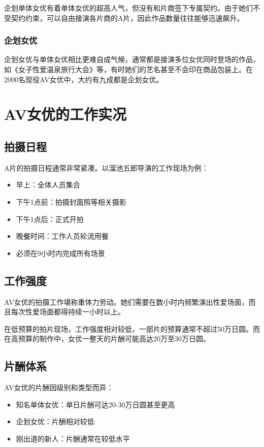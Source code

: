 \documentclass[12pt,UTF8]{ctexbook}
\begin{document}
企划单体女优有着单体女优的超高人气，但没有和片商签下专属契约。由于她们不受契约约束，可以自由接演各片商的A片，因此作品数量往往能够迅速飙升。

\subsection{企划女优}

企划女优与单体女优相比更难自成气候，通常都是接演多位女优同时登场的作品，如《女子性爱温泉旅行大会》等，有时她们的艺名甚至不会印在商品包装上。在2000名现役AV女优中，大约有九成都是企划女优。

\chapter{AV女优的工作实况}

\section{拍摄日程}

A片的拍摄日程通常非常紧凑。以溜池五郎导演的工作现场为例：
\begin{itemize}
\item 早上：全体人员集合
\item 下午1点前：拍摄封面照等相关摄影
\item 下午1点后：正式开拍
\item 晚餐时间：工作人员轮流用餐
\item 必须在9小时内完成所有场景
\end{itemize}

\section{工作强度}

AV女优的拍摄工作堪称重体力劳动。她们需要在数小时内频繁演出性爱场面，而且每次性爱场面都得持续一小时以上。

在低预算的拍片现场，工作强度相对较低，一部片的预算通常不超过50万日圆。而在高预算的制作中，女优一整天的片酬可能高达20万至30万日圆。

\section{片酬体系}

AV女优的片酬因级别和类型而异：
\begin{itemize}
\item 知名单体女优：单日片酬可达20-30万日圆甚至更高
\item 企划女优：片酬相对较低
\item 刚出道的新人：片酬通常在较低水平
\end{itemize}
\end{document}

